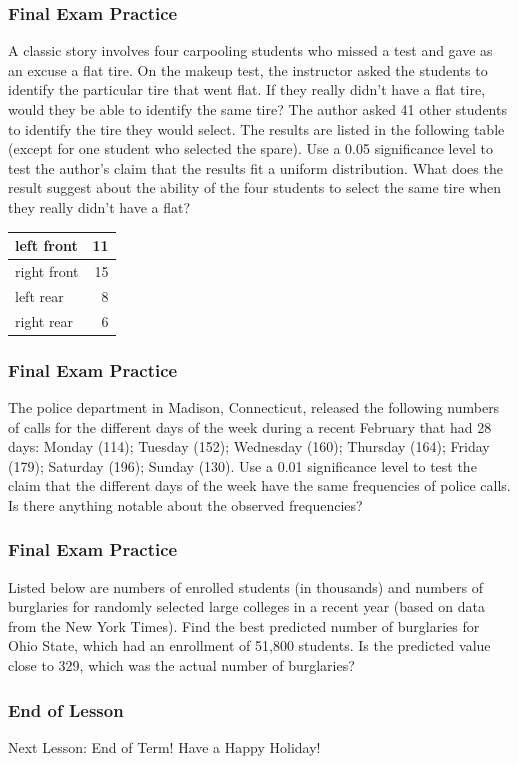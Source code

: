 \documentclass[xcolor=dvipsnames]{beamer} \usepackage{teachbeamer}
\begin{document}
\begin{frame}
  \frametitle{Final Exam Practice} {\ubung} A classic story involves four carpooling students who missed a test and gave as an excuse a flat tire. On the makeup test, the instructor asked the students to identify the particular tire that went flat. If they really didn't have a flat tire, would they be able to identify the same tire? The author asked 41 other students to identify the tire they would select. The results are listed in the following table (except for one student who selected the spare). Use a 0.05 significance level to test the author's claim that the results fit a uniform distribution. What does the result suggest about the ability of the four students to select the same tire when they really didn't have a flat?

  \begin{tabular}{|l|r|}\hline left front & 11 \\ \hline right front & 15 \\ \hline left rear & 8 \\ \hline right rear & 6 \\ \hline
  \end{tabular} %
\end{frame}

\begin{frame}
  \frametitle{Final Exam Practice} {\ubung} The police department in Madison, Connecticut, released the following numbers of calls for the different days of the week during a recent February that had 28 days: Monday (114); Tuesday (152); Wednesday (160); Thursday (164); Friday (179); Saturday (196); Sunday (130). Use a 0.01 significance level to test the claim that the different days of the week have the same frequencies of police calls. Is there anything notable about the observed frequencies?
\end{frame}

\begin{frame}
  \frametitle{Final Exam Practice} {\ubung} Listed below are numbers of enrolled students (in thousands) and numbers of burglaries for randomly selected large colleges in a recent year (based on data from the New York Times). Find the best predicted number of burglaries for Ohio State, which had an enrollment of 51,800 students. Is the predicted value close to 329, which was the actual number of burglaries? %
\end{frame}

\begin{frame}
  \frametitle{End of Lesson} Next Lesson: End of Term! Have a Happy Holiday!
\end{frame}
\end{document}
